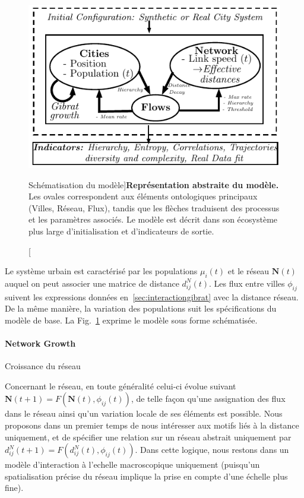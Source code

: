 \begin{figure}
\includegraphics[width=\linewidth]{Figures/MacroCoEvol/model}
\caption[Schematic Model Representation][Schématisation du modèle]{}{\textbf{Représentation abstraite du modèle.} Les ovales correspondent aux éléments ontologiques principaux (Villes, Réseau, Flux), tandis que les flèches traduisent des processus et les paramètres associés. Le modèle est décrit dans son écosystème plus large d'initialisation et d'indicateurs de sortie.\label{fig:macrocoevol:model}}
\end{figure}


Le système urbain est caractérisé par les populations $\mu_i(t)$ et le réseau $\mathbf{N}(t)$ auquel on peut associer une matrice de distance $d^N_{ij}(t)$. Les flux entre villes $\phi_{ij}$ suivent les expressions données en~\ref{sec:interactiongibrat} avec la distance réseau. De la même manière, la variation des populations suit les spécifications du modèle de base. La Fig.~\ref{fig:macrocoevol:model} exprime le modèle sous forme schématisée.




\paragraph{Network Growth}{Croissance du réseau}


Concernant le réseau, en toute généralité celui-ci évolue suivant $\mathbf{N}(t + 1) = F(\mathbf{N}(t),\phi_{ij}(t))$, de telle façon qu'une assignation des flux dans le réseau ainsi qu'un variation locale de ses éléments est possible. Nous proposons dans un premier temps de nous intéresser aux motifs liés à la distance uniquement, et de spécifier une relation sur un réseau abstrait uniquement par $d^N_{ij}(t+1) = F(d^N_{ij}(t),\phi_{ij}(t))$. Dans cette logique, nous restons dans un modèle d'interaction à l'echelle macroscopique uniquement (puisqu'un spatialisation précise du réseau implique la prise en compte d'une échelle plus fine).

